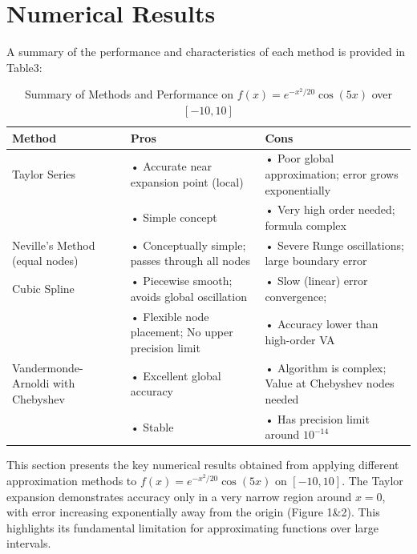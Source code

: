 \documentclass[11pt]{article}
\begin{document}
\section{Numerical Results} 

A summary of the performance and characteristics of each method is provided in Table3:
  \setlength{\tabcolsep}{8pt}  %
  \renewcommand{\arraystretch}{1.3}  %
  \begin{table}[htbp]
    \centering
    \caption{Summary of Methods and Performance on $f(x)=e^{-x^2/20}\cos(5x)$ over $[-10,10]$}
    \label{tab:method_summary}
    \begin{tabular}{@{}p{} p{} p{}@{}}
      \toprule
      \textbf{Method} 
        & \textbf{Pros} 
        & \textbf{Cons} \\
      \midrule
      Taylor Series  
        & • Accurate near expansion point (local)  
        & • Poor global approximation; error grows exponentially\\
        & • Simple concept                        
        & • Very high order needed; formula complex     \\
      \addlinespace
      Neville's Method (equal nodes)  
        & • Conceptually simple; passes through all nodes  
        & • Severe Runge oscillations; large boundary error\\
      \addlinespace
      Cubic Spline  
        & • Piecewise smooth; avoids global oscillation  
        & • Slow (linear) error convergence;  \\
        & • Flexible node placement; No upper precision limit                 
        & • Accuracy lower than high-order VA     \\
      \addlinespace
      Vandermonde-Arnoldi with Chebyshev  
        & • Excellent global accuracy
        & • Algorithm is complex; Value at Chebyshev nodes needed\\
        & • Stable 
        & • Has precision limit around $10^{-14}$         \\
      \bottomrule
    \end{tabular}
  \end{table}
This section presents the key numerical results obtained from applying different approximation methods 
to $f(x) = e^{-x^2/20} \cos(5x)$ on $[-10, 10]$. The Taylor expansion demonstrates accuracy only in a very narrow region 
around $x=0$, with error increasing exponentially away from the origin (Figure 1&2). This highlights its fundamental limitation for 
approximating functions over large intervals.\\
\end{document}
